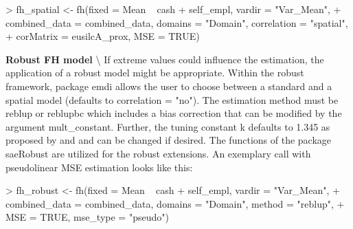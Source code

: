 \begin{example}
\begin{example}
> fh_spatial <- fh(fixed = Mean ~ cash + self_empl, vardir = "Var_Mean",
+   combined_data = combined_data, domains = "Domain", correlation = "spatial",
+   corMatrix = eusilcA_prox, MSE = TRUE)
\end{example}

\textbf{Robust FH model} \textbackslash{}
If extreme values could influence the estimation, the application of a robust model might be appropriate. Within the robust framework, package \texorpdfstring%
{{\normalfont{}\selectfont emdi}}%
{emdi} allows the user to choose between a standard and a spatial model (defaults to \texorpdfstring%
{{\normalfont\ttfamily\hyphenchar{} correlation}}%
{correlation} = \texorpdfstring%
{{\normalfont\ttfamily\hyphenchar{} "no"}}%
{"no"}). The estimation method must be \texorpdfstring%
{{\normalfont\ttfamily\hyphenchar{} reblup}}%
{reblup} or \texorpdfstring%
{{\normalfont\ttfamily\hyphenchar{} reblupbc}}%
{reblupbc} which includes a bias correction that can be modified by the argument \texorpdfstring%
{{\normalfont\ttfamily\hyphenchar{} mult\_constant}}%
{mult\_constant}. Further, the tuning constant \texorpdfstring%
{{\normalfont\ttfamily\hyphenchar{} k}}%
{k} defaults to 1.345 as proposed by \citet{Sinha2009} and \citet{Warnholz2016} and can be changed if desired. The functions of the package \texorpdfstring%
{{\normalfont{}\selectfont saeRobust}}%
{saeRobust} are utilized for the robust extensions. An exemplary call with pseudolinear MSE estimation looks like this:

\begin{example}
> fh_robust <- fh(fixed = Mean ~ cash + self_empl, vardir = "Var_Mean",
+   combined_data = combined_data, domains = "Domain", method = "reblup",
+   MSE = TRUE, mse_type = "pseudo")
\end{example}


\end{example}
